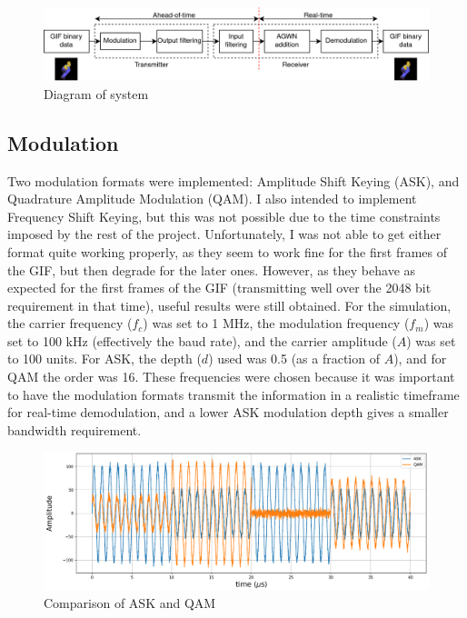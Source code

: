 \documentclass{article}
\begin{document}
\noindent
\begin{figure}[h]
    \includegraphics[width=\linewidth]{figures/system-diagram.png}
    \caption{Diagram of system}
\end{figure}

\subsection{Modulation}
Two modulation formats were implemented: Amplitude Shift Keying (ASK), and Quadrature Amplitude Modulation (QAM). I also intended to implement Frequency Shift Keying, but this was not possible due to the time constraints imposed by the rest of the project. Unfortunately, I was not able to get either format quite working properly, as they seem to work fine for the first frames of the GIF, but then degrade for the later ones. However, as they behave as expected for the first frames of the GIF (transmitting well over the 2048 bit requirement in that time), useful results were still obtained. For the simulation, the carrier frequency ($f_c$) was set to 1 MHz, the modulation frequency ($f_m$) was set to 100 kHz (effectively the baud rate), and the carrier amplitude ($A$) was set to 100 units. For ASK, the depth ($d$) used was 0.5 (as a fraction of $A$), and for QAM the order was 16. These frequencies were chosen because it was important to have the modulation formats transmit the information in a realistic timeframe for real-time demodulation, and a lower ASK modulation depth gives a smaller bandwidth requirement.

\noindent
\begin{figure}[h]
    \includegraphics[width=\linewidth]{figures/modulation.png}
    \caption{Comparison of ASK and QAM}
\end{figure}
\end{document}
